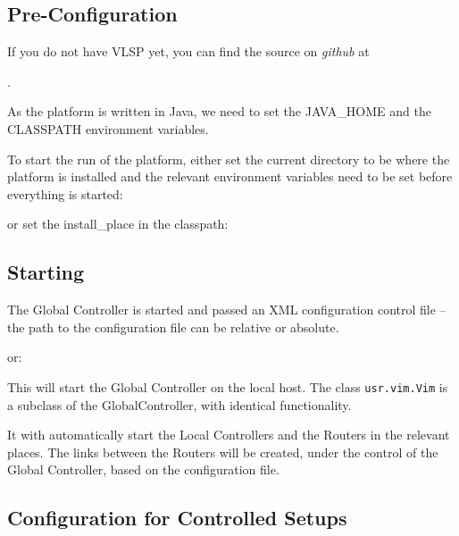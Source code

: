 \subsection{Pre-Configuration}

If you do not have VLSP yet, you can find the source on
\textit{github} at

.


As the platform is
written in Java, we need to set the JAVA\_HOME and the CLASSPATH
environment variables.


\noindent To start the run of the platform, either set the current directory
to be where the platform is installed and the relevant environment variables
need to be set before everything is started:



\noindent or set the install\_place in the classpath:


\subsection{Starting}

The Global Controller is started and passed an XML
configuration control file -- the path to the configuration file can
be relative or absolute. 


\noindent or:


\noindent This will start the Global Controller on the local host.
The class \texttt{usr.vim.Vim} is a subclass of the GlobalController,
with identical functionality.

It with automatically start the Local Controllers and the Routers in the
relevant places.  The links between the Routers will be created, under
the control of the Global Controller, based on the configuration file.



\subsection{Configuration for Controlled Setups}

